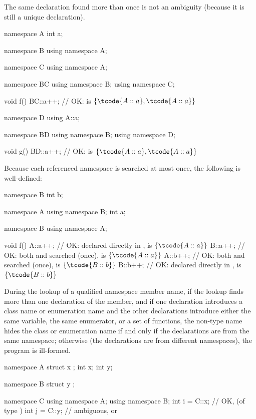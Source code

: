 \pnum
\begin{note}
The same declaration found more than once is not an ambiguity (because
it is still a unique declaration).
\begin{example}
\begin{codeblock}
namespace A {
  int a;
}

namespace B {
  using namespace A;
}

namespace C {
  using namespace A;
}

namespace BC {
  using namespace B;
  using namespace C;
}

void f()
{
  BC::a++;          // OK:  is $\{ \tcode{A::a}, \tcode{A::a} \}$
}

namespace D {
  using A::a;
}

namespace BD {
  using namespace B;
  using namespace D;
}

void g()
{
  BD::a++;          // OK:  is $\{ \tcode{A::a}, \tcode{A::a} \}$
}
\end{codeblock}
\end{example}
\end{note}

\pnum
\begin{example}
Because each referenced namespace is searched at most once, the
following is well-defined:
\begin{codeblock}
namespace B {
  int b;
}

namespace A {
  using namespace B;
  int a;
}

namespace B {
  using namespace A;
}

void f()
{
  A::a++;           // OK:  declared directly in ,  is $\{ \tcode{A::a} \}$
  B::a++;           // OK: both  and  searched (once),  is $\{ \tcode{A::a} \}$
  A::b++;           // OK: both  and  searched (once),  is $\{ \tcode{B::b} \}$
  B::b++;           // OK:  declared directly in ,  is $\{ \tcode{B::b} \}$
}
\end{codeblock}
\end{example}

\pnum
During the lookup of a qualified namespace member name, if the lookup
finds more than one declaration of the member, and if one declaration
introduces a class name or enumeration name and the other declarations
introduce either the same variable, the same enumerator, or a set of
functions, the non-type name hides the class or enumeration name if and
only if the declarations are from the same namespace; otherwise (the
declarations are from different namespaces), the program is ill-formed.
\begin{example}
\begin{codeblock}
namespace A {
  struct x { };
  int x;
  int y;
}

namespace B {
  struct y { };
}

namespace C {
  using namespace A;
  using namespace B;
  int i = C::x;     // OK,  (of type )
  int j = C::y;     // ambiguous,  or 
}
\end{codeblock}
\end{example}

